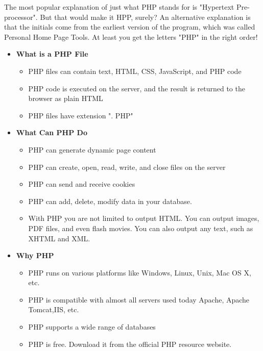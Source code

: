 The most popular explanation of just what PHP stands for is "Hypertext Pre-processor". But that would make it HPP, surely? An alternative explanation is that the initials come from the earliest version of the program, which was called Personal Home Page Tools. At least you get the letters "PHP" in the right order!
\begin{itemize}

\item {\bfseries What is a PHP File}
\begin{itemize}

\item PHP files can contain text, HTML, CSS, JavaScript, and PHP code
\item PHP code is executed on the server, and the result is returned to the browser as plain HTML
\item PHP files have extension ". PHP"
\end{itemize}

\item {\bfseries What Can PHP Do}
\begin{itemize}

\item PHP can generate dynamic page content
\item PHP can create, open, read, write, and close files on the server
\item PHP can send and receive cookies
\item PHP can add, delete, modify data in your database.
\item With PHP you are not limited to output HTML. You can output images, PDF files, and even flash movies. You can also output any text, such as XHTML and XML.
\end{itemize}

\item {\bfseries Why PHP}

\begin{itemize}
\item PHP runs on various platforms like Windows, Linux, Unix, Mac OS X, etc.
\item PHP is compatible with almost all servers used today Apache, Apache Tomcat,IIS, etc.
\item PHP supports a wide range of databases
\item PHP is free. Download it from the official PHP resource website.
\end{itemize}
\end{itemize}


